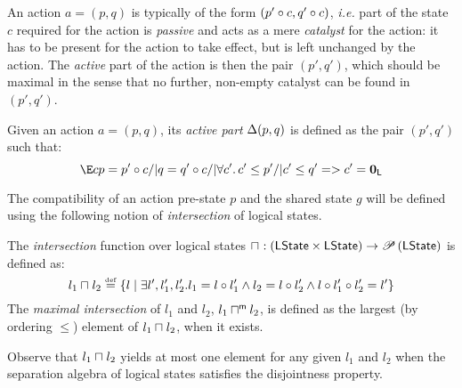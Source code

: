 An action $a = (p, q)$ is typically of the form $(p'\circ c, q'\circ c)$, \textit{i.e.} part of the state $c$ required for the action is \emph{passive} and acts as a mere \emph{catalyst} for the action: it has to be present for the action to take effect, but is left unchanged by the action. The \emph{active} part of the action is then the pair $(p',q')$, which should be maximal in the sense that no further, non-empty catalyst can be found in $(p',q')$.
%
%
\begin{definition}
Given an action $a = (p, q)$, its \emph{active part} $\Delta {(p,q)}$ is defined as the pair $(p', q')$ such that:
%
\[
	\E c p = p' \composeL c /| q = q' \composeL c /| \V{c'} c'\leq p' /|
  c'\leq q' => c' = \unitL
\]
%
\end{definition}
%
%
%
%
The compatibility of an action pre-state $p$ and the shared state $g$ will be defined using the following notion of \emph{intersection} of logical states.
%
%
\begin{definition}[Intersection]
The \emph{intersection} function over logical states 
$
\sqcap_{} : \left(\textsf{LState} \times \textsf{LState} \right) \rightarrow \mathscr{P}\left(\textsf{LState} \right)
$
is defined as:
%
\[
	l_1 \sqcap_{} l_2 \mathrel{\stackrel{\smash{\scriptscriptstyle{\mathrm{def}}}}{=}} 
	\left\{ 
		l  \mid
		\exists l', l_1', l_2'.\,\! l_1 = l \circ l_1' \land l_2 = l \circ l_2' \land l \circ l_1' \circ l_2' = l'
	\right\}
\]
%
The \emph{maximal intersection} of $l_1$ and $l_2$, $l_1 \sqcap_{}^{\textsf{m}} l_2$, is defined as the largest (by ordering $\leq$) element of $l_1 \sqcap_{} l_2$, when it exists.
%
\end{definition}

Observe that $l_1\sqcap_{} l_2$ yields at most one element for any given $l_1$ and $l_2$ when the separation algebra of logical states satisfies the disjointness property.

